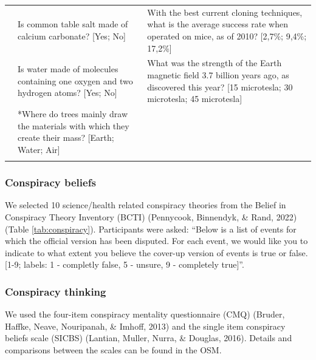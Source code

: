 \documentclass[
  doc,floatsintext]{apa6}
\begin{document}
\begin{longtable}[t]{>{\raggedleft\arraybackslash}p{2em}>{\raggedright\arraybackslash}p{22em}>{\raggedright\arraybackslash}p{22em}}
9 & Is common table salt made of calcium carbonate? [Yes; No] & With the best current cloning techniques, what is the average success rate when operated on mice, as of 2010? [2,7\%; 9,4\%; 17,2\%]\\
10 & Is water made of molecules containing one oxygen and two hydrogen atoms? [Yes; No] & What was the strength of the Earth magnetic field 3.7 billion years ago, as discovered this year? [15 microtesla; 30 microtesla; 45 microtesla]\\
\addlinespace
11 & *Where do trees mainly draw the materials with which they create their mass? [Earth; Water; Air] & \\
\bottomrule
\multicolumn{3}{l}{\rule{0pt}{1em}\textsuperscript{*} Only used in Study 1}\\
\end{longtable}
\endgroup{}

\subsubsection{Conspiracy beliefs}\label{conspiracy-beliefs}

We selected 10 science/health related conspiracy theories from the Belief in Conspiracy Theory Inventory (BCTI) (Pennycook, Binnendyk, \& Rand, 2022) (Table \ref{tab:conspiracy}). Participants were asked: ``Below is a list of events for which the official version has been disputed. For each event, we would like you to indicate to what extent you believe the cover-up version of events is true or false. {[}1-9; labels: 1 - completly false, 5 - unsure, 9 - completely true{]}''.

\subsubsection{Conspiracy thinking}\label{conspiracy-thinking}

We used the four-item conspiracy mentality questionnaire (CMQ) (Bruder, Haffke, Neave, Nouripanah, \& Imhoff, 2013) and the single item conspiracy beliefs scale (SICBS) (Lantian, Muller, Nurra, \& Douglas, 2016). Details and comparisons between the scales can be found in the OSM.

\begingroup\fontsize{8}{10}\selectfont
\end{document}

